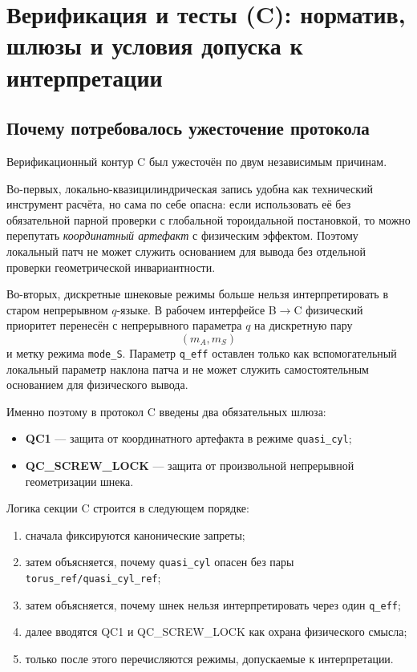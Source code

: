 %

\section{Верификация и тесты (C): норматив, шлюзы и условия допуска к интерпретации}
\label{sec:sec_tests_C}

\subsection{Почему потребовалось ужесточение протокола}

Верификационный контур C был ужесточён по двум независимым причинам.

Во-первых, локально-квазицилиндрическая запись удобна как технический инструмент расчёта, но сама по себе опасна: если использовать её без обязательной парной проверки с глобальной тороидальной постановкой, то можно перепутать \emph{координатный артефакт} с физическим эффектом. Поэтому локальный патч не может служить основанием для вывода без отдельной проверки геометрической инвариантности.

Во-вторых, дискретные шнековые режимы больше нельзя интерпретировать в старом непрерывном $q$-языке. В рабочем интерфейсе B$\to$C физический приоритет перенесён с непрерывного параметра $q$ на дискретную пару
\[
(m_A,m_S)
\]
и метку режима \texttt{mode\_S}. Параметр \texttt{q\_eff} оставлен только как вспомогательный локальный параметр наклона патча и не может служить самостоятельным основанием для физического вывода.

Именно поэтому в протокол C введены два обязательных шлюза:
\begin{itemize}
\item \textbf{QC1} --- защита от координатного артефакта в режиме \texttt{quasi\_cyl};
\item \textbf{QC\_SCREW\_LOCK} --- защита от произвольной непрерывной геометризации шнека.
\end{itemize}

Логика секции C строится в следующем порядке:
\begin{enumerate}
\item сначала фиксируются канонические запреты;
\item затем объясняется, почему \texttt{quasi\_cyl} опасен без пары \texttt{torus\_ref/quasi\_cyl\_ref};
\item затем объясняется, почему шнек нельзя интерпретировать через один \texttt{q\_eff};
\item далее вводятся QC1 и QC\_SCREW\_LOCK как охрана физического смысла;
\item только после этого перечисляются режимы, допускаемые к интерпретации.
\end{enumerate}

